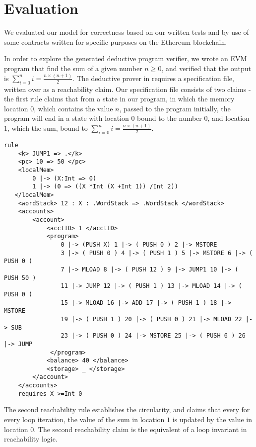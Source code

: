 \section{Evaluation}
We evaluated our model for correctness based on our written tests and by use of
some contracts written for specific purposes on the Ethereum blockchain.


In order to explore the generated deductive program verifier, we wrote an EVM program that find the sum of a given number $n \geq 0 $, and verified that the output is $ \sum_{i = 0}^{n} i =  \frac{n \times  (n + 1 )}{2}$. The deductive prover in \K{} requires a specification file, written over as a reachability claim. Our specification file consists of two claims - the first rule claims that from a state in our program, in which the memory location $0$, which contains the value $n$, passed to the program initially, the program will end in a state with location $0$ bound to the number $0$, and location $1$, which the sum, bound to $ \sum_{i = 0}^{n} i =  \frac{n \times  (n + 1 )}{2} $. 

\begin{verbatim}
rule
    <k> JUMP1 => .</k>
    <pc> 10 => 50 </pc>
    <localMem> 
    	0 |-> (X:Int => 0) 
    	1 |-> (0 => ((X *Int (X +Int 1)) /Int 2)) 
   </localMem>
    <wordStack> 12 : X : .WordStack => .WordStack </wordStack> 
    <accounts> 
        <account> 
            <acctID> 1 </acctID> 
            <program> 
        		0 |-> (PUSH X) 1 |-> ( PUSH 0 ) 2 |-> MSTORE 
	            3 |-> ( PUSH 0 ) 4 |-> ( PUSH 1 ) 5 |-> MSTORE 6 |-> ( PUSH 0 ) 
	            7 |-> MLOAD 8 |-> ( PUSH 12 ) 9 |-> JUMP1 10 |-> ( PUSH 50 ) 
	            11 |-> JUMP 12 |-> ( PUSH 1 ) 13 |-> MLOAD 14 |-> ( PUSH 0 ) 
	            15 |-> MLOAD 16 |-> ADD 17 |-> ( PUSH 1 ) 18 |-> MSTORE 
	            19 |-> ( PUSH 1 ) 20 |-> ( PUSH 0 ) 21 |-> MLOAD 22 |-> SUB 
	            23 |-> ( PUSH 0 ) 24 |-> MSTORE 25 |-> ( PUSH 6 ) 26 |-> JUMP 
		     </program>
            <balance> 40 </balance>
            <storage> _ </storage>
        </account> 
    </accounts>
    requires X >=Int 0 
\end{verbatim}        



The second reachability rule establishes the circularity, and claims that every for every loop iteration, the value of the sum in location $1$ is updated by the value in location $0$. The second reachability claim is the equivalent of a loop invariant in reachability logic.

